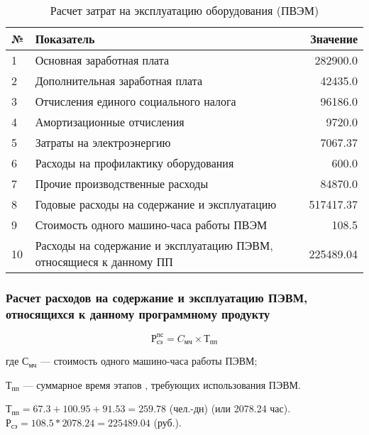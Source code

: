 \begin{table}[H]
\caption{Расчет затрат на эксплуатацию оборудования (ПВЭМ)}
\begin{tabular}{|l|p{13cm}|r|}
\hline{}
№ & Показатель & Значение \\
\hline{}
1 & Основная заработная плата & 282900.0 \\
\hline{}
2 & Дополнительная заработная плата & 42435.0 \\
\hline{}
3 & Отчисления единого социального налога & 96186.0 \\
\hline{}
4 & Амортизационные отчисления & 9720.0 \\
\hline{}
5 & Затраты на электроэнергию & 7067.37 \\
\hline{}
6 & Расходы на профилактику оборудования & 600.0 \\
\hline{}
7 & Прочие производственные расходы & 84870.0 \\
\hline{}
8 & Годовые расходы на содержание и эксплуатацию & 517417.37 \\
\hline{}
9 & Стоимость одного машино-часа работы ПВЭМ & 108.5 \\
\hline{}
10 & Расходы на содержание и эксплуатацию ПЭВМ, относящиеся к данному ПП & 225489.04 \\
\hline
\end{tabular}
\label{table:staffExp}
\end{table}



\subsubsection{Расчет расходов на содержание и эксплуатацию ПЭВМ, относящихся к данному программному продукту}
\begin{equation}Р_{сэ}^{пс} = C_{мч} \times{} Т_{пп}\end{equation}
\begin{ESKDexplanation}
	\item[где ]{} $С_{мч}$ --- стоимость одного машино-часа работы ПЭВМ;
	\item{} $\textrm{Т}_\textrm{пп}$ --- суммарное время этапов , требующих использования ПЭВМ.
\end{ESKDexplanation}
$Т_{пп} =  67.3 + 100.95 + 91.53 =259 .78$ (чел.-дн) (или 2078.24 час).
$Р_{сэ} =  108.5 * 2078.24 = 225489.04$ (руб.).

